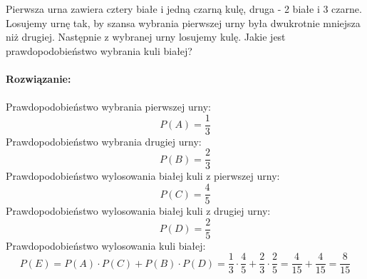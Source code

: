 
\medskip
{} 
\medskip

Pierwsza urna zawiera cztery białe i jedną czarną kulę, druga - 2 białe i 3 czarne. Losujemy urnę tak, by szansa wybrania pierwszej urny była dwukrotnie mniejsza niż drugiej. Następnie z wybranej urny losujemy kulę. Jakie jest prawdopodobieństwo wybrania kuli białej?\\\\
\textbf{Rozwiązanie:} \\\\
Prawdopodobieństwo wybrania pierwszej urny:
$$
P(A)=\frac{1}{3}
$$
Prawdopodobieństwo wybrania drugiej urny:
$$
P(B)=\frac{2}{3}
$$
Prawdopodobieństwo wylosowania białej kuli z pierwszej urny:
$$
P(C)= \frac{4}{5}
$$
Prawdopodobieństwo wylosowania białej kuli z drugiej urny:
$$
P(D)= \frac{2}{5}
$$
Prawdopodobieństwo wylosowania kuli białej:
$$
P(E)= P(A)\cdot P(C) + P(B) \cdot P(D)=\frac{1}{3} \cdot \frac{4}{5} + \frac{2}{3} \cdot \frac{2}{5}= \frac{4}{15} + \frac{4}{15} = \frac{8}{15}
$$
 
